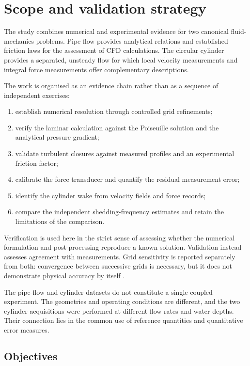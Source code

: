 \section{Scope and validation strategy}

The study combines numerical and experimental evidence for two canonical fluid-mechanics problems. Pipe flow provides analytical relations and established friction laws for the assessment of CFD calculations. The circular cylinder provides a separated, unsteady flow for which local velocity measurements and integral force measurements offer complementary descriptions.

The work is organised as an evidence chain rather than as a sequence of independent exercises:
\begin{enumerate}
    \item establish numerical resolution through controlled grid refinements;
    \item verify the laminar calculation against the Poiseuille solution and the analytical pressure gradient;
    \item validate turbulent closures against measured profiles and an experimental friction factor;
    \item calibrate the force transducer and quantify the residual measurement error;
    \item identify the cylinder wake from velocity fields and force records;
    \item compare the independent shedding-frequency estimates and retain the limitations of the comparison.
\end{enumerate}

Verification is used here in the strict sense of assessing whether the numerical formulation and post-processing reproduce a known solution. Validation instead assesses agreement with measurements. Grid sensitivity is reported separately from both: convergence between successive grids is necessary, but it does not demonstrate physical accuracy by itself \cite{celik2008}.

The pipe-flow and cylinder datasets do not constitute a single coupled experiment. The geometries and operating conditions are different, and the two cylinder acquisitions were performed at different flow rates and water depths. Their connection lies in the common use of reference quantities and quantitative error measures.

\subsection{Objectives}

